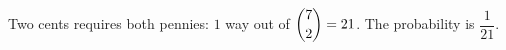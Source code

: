 Two cents requires both pennies: $1$ way out of $\dbinom72=21$. The probability is $\boxed{\dfrac{1}{21}}$.
